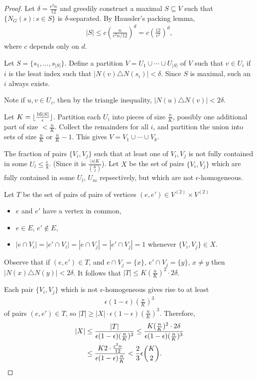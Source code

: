 \documentclass{article}
\DeclarePairedDelimiter\floor{\lfloor}{\rfloor}
\begin{document}
\begin{proof}
  Let $\delta = \frac{\epsilon^2 n}{12}$ and greedily construct a maximal $S \subseteq V$ such that $\{N_G(s) : s \in S\}$ is $\delta$-separated.
  By Haussler's packing lemma,
  \begin{align*}
    |S| \leq c (\frac{n}{\epsilon^2 n/12})^d = c (\frac{12}{\epsilon^2})^d,
  \end{align*}
  where $c$ depends only on $d$.

  Let $S = \{s_1, \dotsc, s_{|S|}\}$.
  Define a partition $V = U_1 \cup \dotsb \cup U_{|S|}$ of $V$ such that $v \in U_i$ if $i$ is the lesat index such that $|N(v) \triangle N(s_i)| < \delta$. Since $S$ is maximal, such an $i$ always exists.

  Note if $u,v \in U_i$, then by the triangle inequality, $|N(u) \triangle N(v)| < 2 \delta$.

  Let $K = \floor{\frac{16|S|}{\epsilon}}$. Partition each $U_i$ into pieces of size $\frac{n}{K}$, possibly one additional part of size $<\frac{n}{K}$.
  Collect the remainders for all $i$, and partition the union into sets of size $\frac{n}{K}$ or $\frac{n}{K}-1$.
  This gives $V = V_1 \cup \dotsb \cup V_k$.

  The fraction of pairs $\{V_i, V_j\}$ such that at least one of $V_i, V_j$ is not fully contained in some $U_l \leq \frac{\epsilon}{8}$. (Since it is $\frac{|s|K}{\binom{K}{2}}$).
  Let $X$ be the set of pairs $\{V_i, V_j\}$ which are fully contained in some $U_l$, $U_m$ repsectively, but which are not $\epsilon$-homogeneous.

  Let $T$ be the set of pairs of pairs of vertices $(e,e') \in V^{(2)} \times V^{(2)}$
  \begin{itemize}
    \item $e$ and $e'$ have a vertex in common,
    \item $e \in E$, $e' \notin E$,
    \item $|e \cap V_i| = |e' \cap V_i| = |e \cap V_j| = |e' \cap V_j| = 1$ whenever $\{V_i,V_j\} \in X$.
  \end{itemize}
  Observe that if $(e,e') \in T$, and $e \cap V_j = \{x\}$, $e' \cap V_j = \{y\}$, $x \neq y$ then $|N(x) \triangle N(y)| < 2 \delta$.
  It follows that $|T| \leq K (\frac{n}{K})^2 \cdot 2 \delta$.

  Each pair $\{V_i,V_j\}$ which is not $\epsilon$-homogeneous gives rise to at least
  \begin{align*}
    \epsilon(1-\epsilon) \left(\frac nK\right)^3
  \end{align*}
  of pairs $(e,e') \in T$, so $|T| \geq |X| \cdot \epsilon (1-\epsilon) (\frac nK)^3$.
  Therefore,
  \begin{align*}
    |X| &\leq \frac{|T|}{\epsilon (1-\epsilon) (\frac nK)^3} \leq \frac{K (\frac nK)^2 \cdot 2 \delta}{\epsilon (1-\epsilon) (\frac nK)^3} \\
        &\leq \frac{K 2 \cdot \frac{\epsilon^2 n}{12}}{\epsilon (1-\epsilon) \frac nK} < \frac{2}{3} \epsilon \binom{K}{2}. \qedhere
  \end{align*}
\end{proof}
\end{document}
